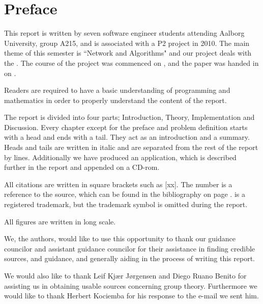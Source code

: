 \chapter*{Preface}
%
\emptyTop{}%
\vspace{-15mm}%
This report is written by seven software engineer students attending Aalborg University, group A215, and is associated with a P2 project in 2010.
The main theme of this semester is ``Network and Algorithms" and our project deals with the \rubik{}.
The course of the project was commenced on , and the paper was handed in on .

Readers are required to have a basic understanding of programming and mathematics in order to properly understand the content of the report. 

The report is divided into four parts; Introduction, Theory, Implementation and Discussion. Every chapter except for the preface and problem definition starts with a head and ends with a tail. They act as an introduction and a summary. Heads and tails are written in italic and are separated from the rest of the report by lines. 
Additionally we have produced an application, which is described further in the report and appended on a CD-rom.

All citations are written in square brackets such as [xx]. The number is a reference to the source, which can be found in the bibliography on page \pageref{chap:bib}. 
\rubik{} is a registered trademark, but the trademark symbol is omitted during the report.

All figures are written in long scale.%

We, the authors, would like to use this opportunity to thank our guidance councilor and assistant guidance councilor for their assistance in finding credible sources, and guidance, and generally aiding in the process of writing this report. 

We would also like to thank Leif Kj\ae{}r J\o{}rgensen and Diego Ruano Benito for assisting us in obtaining usable sources concerning group theory.
Furthermore we would like to thank Herbert Kociemba for his response to the e-mail we sent him.
